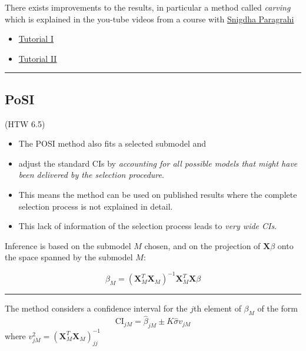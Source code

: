 \documentclass[
  letterpaper,
  DIV=11,
  numbers=noendperiod]{scrartcl}
\providecommand{\tightlist}{%
  \setlength{\itemsep}{0pt}\setlength{\parskip}{0pt}}\usepackage{longtable,booktabs,array}
\begin{document}
There exists improvements to the results, in particular a method called
\emph{carving} which is explained in the you-tube videos from a course
with
\href{https://lsa.umich.edu/stats/people/faculty/psnigdha.html}{Snigdha
Paragrahi}

\begin{itemize}
\tightlist
\item
  \href{https://www.youtube.com/watch?v=qofrkW-DL7c\&t=3682s}{Tutorial
  I}
\item
  \href{https://www.youtube.com/watch?v=rGHf6BPeqBg\&t=1105s}{Tutorial
  II}
\end{itemize}

\begin{center}\rule{0.5\linewidth}{0.5pt}\end{center}

\hypertarget{posi}{%
\subsection{PoSI}\label{posi}}

(HTW 6.5)

\begin{itemize}
\tightlist
\item
  The POSI method also fits a selected submodel and
\item
  adjust the standard CIs by \emph{accounting for all possible models
  that might have been delivered by the selection procedure}.
\item
  This means the method can be used on published results where the
  complete selection process is not explained in detail.
\item
  This lack of information of the selection process leads to \emph{very
  wide CIs}.
\end{itemize}

Inference is based on the submodel \(M\) chosen, and on the projection
of \({\boldsymbol X} \beta\) onto the space spanned by the submodel
\(M\):

\[\beta_M=({\boldsymbol X}_M^T{\boldsymbol X}_M)^{-1}{\boldsymbol X}_M^T{\boldsymbol X} \beta\]

\begin{center}\rule{0.5\linewidth}{0.5pt}\end{center}

The method considers a confidence interval for the \(j\)th element of
\(\beta_M\) of the form
\[\text{CI}_{jM}=\hat{\beta}_{jM}\pm K \hat{\sigma}v_{jM}\] where
\(v_{jM}^2=({\boldsymbol X}_M^T{\boldsymbol X}_M)^{-1}_{jj}\)
\end{document}
